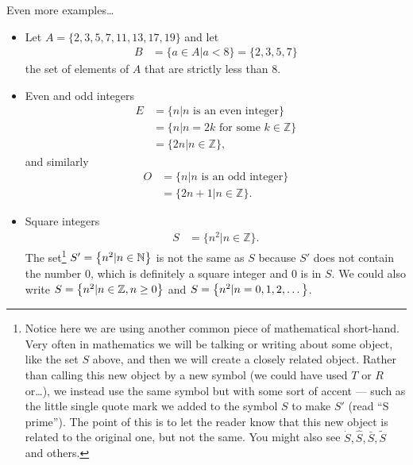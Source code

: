 \begin{eg}\label{eg_0_3_1}
  Even more examples\dots
\begin{itemize}
 \item Let $A = \{2,3,5,7,11,13,17,19\}$ and let
 \begin{align*}
  B &= \{ a \in A | a<8\} = \{2,3,5,7\}
  \end{align*}
  the set of elements of $A$ that are strictly less than 8.

\item Even and odd integers
\begin{align*}
E &= \{ n | n \mbox{ is an even integer} \} \\
 &= \{n | n =2k \mbox{ for some $k \in \mathbb{Z}$} \} \\
 &= \{2n | n \in \mathbb{Z}\},
\end{align*}
and similarly
\begin{align*}
  O &= \{ n | n \mbox{ is an odd integer} \} \\
  &= \{2n+1 | n \in \mathbb{Z}\}.
\end{align*}

\item Square integers
\begin{align*}
  S &= \{n^2 | n \in \mathbb{Z}\}.
\end{align*}
The set\footnote{Notice here we are using another common piece of mathematical
short-hand. Very often in mathematics we will be talking or writing about some
object, like the set $S$ above, and then we will create a closely related
object. Rather than calling this new object by a new symbol (we could have used
$T$ or $R$ or\dots), we instead use the same symbol but with some sort of accent
--- such as the little single quote mark we added to the symbol $S$ to make
$S'$ (read ``S prime''). The point of this is to let the reader know that this
new object is related to the original one, but not the same. You might also see
$\dot{S}, \hat{S}, \bar{S}, \tilde{S}$ and others.} $S'= \left\{n^2 | n \in
\mathbb{N}\right\}$ is not the same as $S$ because $S'$ does not contain the number
$0$, which is definitely a square integer and $0$ is in $S$. We could also write
$S = \left\{n^2 | n \in \mathbb{Z}, n \geq 0\right\}$ and $S=\left\{n^2 | n=0,1,2,\dots\right\}$.
\end{itemize}
\end{eg}


